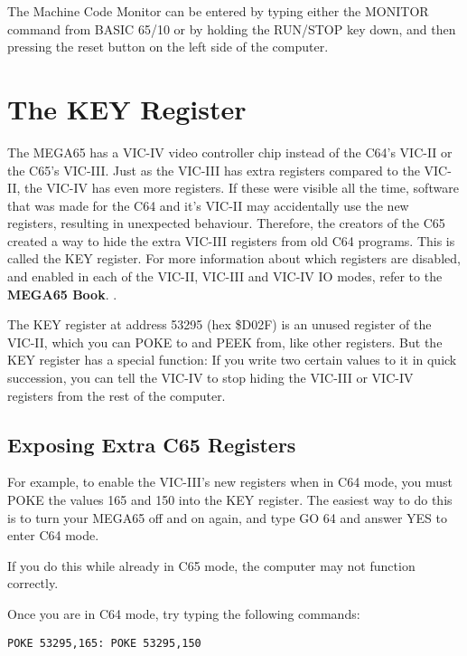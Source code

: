 The Machine Code Monitor can be entered by typing either the MONITOR
command from BASIC 65/10 or by holding the RUN/STOP key
down, and then pressing the reset button on the left side of the
computer.

\section{The KEY Register}

The MEGA65 has a VIC-IV video controller chip instead of the C64's VIC-II or
the C65's VIC-III.  Just as the VIC-III has extra registers compared to the
VIC-II, the VIC-IV has even more registers.  If these were visible all the time,
software that was made for the C64 and it's VIC-II may accidentally use the
new registers, resulting in unexpected behaviour.  Therefore, the
creators of the C65 created a way to hide the extra VIC-III registers from old
C64 programs. This is called the KEY register. For more information
about which registers are disabled, and enabled in each of the
VIC-II, VIC-III and VIC-IV IO modes, refer to
\ifdefined\printmanual
 the {\bf MEGA65 Book}.
\else
 .
\fi


The KEY register at address 53295 (hex \$D02F) is an unused register of the VIC-II, which you can POKE to and
PEEK from, like other registers.  But the KEY register has a special function: If
you write two certain values to it in quick succession, you can tell the VIC-IV
to stop hiding the VIC-III or VIC-IV registers from the rest of the computer.

\subsection{Exposing Extra C65 Registers}

For example, to enable the VIC-III's new registers when in C64 mode, you must POKE the values 165 and 150
into the KEY register. The easiest way to do this is to turn your MEGA65 off and on again, and type GO 64
and answer YES to enter C64 mode.

If you do this while already in C65 mode, the computer may not function correctly.

Once you are in C64 mode, try typing the following commands:

\begin{tcolorbox}[colback=black,coltext=white]
\verbatimfont{\codefont}
\begin{verbatim}
POKE 53295,165: POKE 53295,150
\end{verbatim}
\end{tcolorbox}

